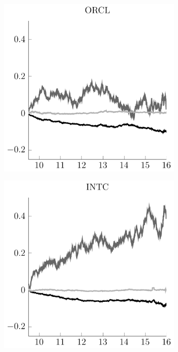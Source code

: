 \begin{frame}
\begin{figure}
\begin{subfigure}[b]{.4\linewidth}
\end{subfigure}\\%
\vspace{1cm}%
\begin{subfigure}[b]{.4\linewidth}%
  \includegraphics[scale=1]{frames/figs/ORCL_naive_strat_comp.pdf}%
\end{subfigure}%
\hspace{1.5cm}%
\begin{subfigure}[b]{.4\linewidth}%
  \includegraphics[scale=1]{frames/figs/INTC_naive_strat_comp.pdf}%
\end{subfigure}\\%
%
\leavevmode{}\hspace{0pt plus 1filll}\null%


\end{figure}
\end{frame}
